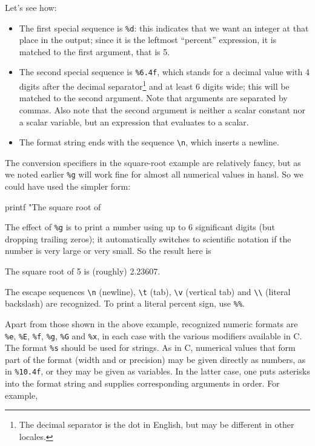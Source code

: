Let's see how:
\begin{itemize}
\item The first special sequence is \verb|%d|: this indicates that we
  want an integer at that place in the output; since it is the
  leftmost ``percent'' expression, it is matched to the first
  argument, that is 5.
\item The second special sequence is \verb|%6.4f|, which stands for a
  decimal value with 4 digits after the decimal separator\footnote{The
    decimal separator is the dot in English, but may be different in
    other locales.} and at least 6 digits wide; this will be matched
  to the second argument. Note that arguments are separated by
  commas. Also note that the second argument is neither a scalar
  constant nor a scalar variable, but an expression that evaluates to
  a scalar.
\item The format string ends with the sequence \verb|\n|, which
  inserts a newline.
\end{itemize}

The conversion specifiers in the square-root example are relatively
fancy, but as we noted earlier \texttt{\%g} will work fine for
almost all numerical values in hansl. So we could have used the
simpler form:
\begin{code}
printf "The square root of %
\end{code}
The effect of \texttt{\%g} is to print a number using up to 6
significant digits (but dropping trailing zeros); it automatically
switches to scientific notation if the number is very large or very
small. So the result here is
\begin{code}
The square root of 5 is (roughly) 2.23607.
\end{code}

The escape sequences \verb|\n| (newline), \verb|\t| (tab), \verb|\v|
(vertical tab) and \verb|\\| (literal backslash) are recognized. To
print a literal percent sign, use \verb|%%|.

Apart from those shown in the above example, recognized numeric
formats are \verb|%e|, \verb|%E|, \verb|%f|, \verb|%g|, \verb|%G| and
\verb|%x|, in each case with the various modifiers available in C. The
format \verb|%s| should be used for strings.
As in C, numerical values that form part of the format (width and or
precision) may be given directly as numbers, as in \verb|%10.4f|, or
they may be given as variables. In the latter case, one puts asterisks
into the format string and supplies corresponding arguments in
order. For example,

